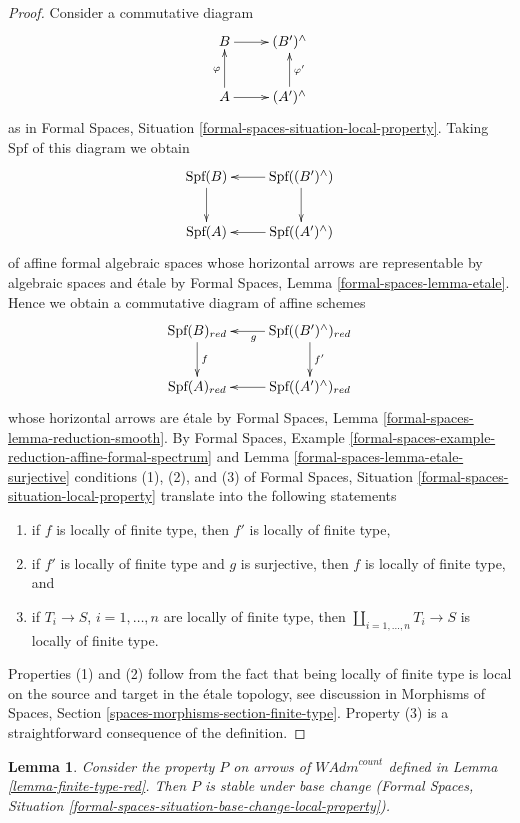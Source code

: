 \documentclass{stacks-project}
\theoremstyle{plain}
\newtheorem{lemma}[subsection]{Lemma}
\theoremstyle{definition}
\theoremstyle{remark}
\numberwithin{equation}{subsection}
\begin{document}
\begin{proof}
Consider a commutative diagram
$$
\xymatrix{
B \ar[r] & (B')^\wedge \\
A \ar[r] \ar[u]^\varphi & (A')^\wedge \ar[u]_{\varphi'}
}
$$
as in Formal Spaces, Situation
\ref{formal-spaces-situation-local-property}.
Taking $\text{Spf}$ of this diagram we obtain
$$
\xymatrix{
\text{Spf}(B) \ar[d] &
\text{Spf}((B')^\wedge) \ar[l] \ar[d] \\
\text{Spf}(A) &
\text{Spf}((A')^\wedge) \ar[l]
}
$$
of affine formal algebraic spaces whose horizontal arrows are
representable by algebraic spaces and \'etale by
Formal Spaces, Lemma \ref{formal-spaces-lemma-etale}.
Hence we obtain a commutative diagram of affine schemes
$$
\xymatrix{
\text{Spf}(B)_{red} \ar[d]^f &
\text{Spf}((B')^\wedge)_{red} \ar[l]^g \ar[d]^{f'} \\
\text{Spf}(A)_{red} &
\text{Spf}((A')^\wedge)_{red} \ar[l]
}
$$
whose horizontal arrows are \'etale by
Formal Spaces, Lemma \ref{formal-spaces-lemma-reduction-smooth}.
By Formal Spaces, Example
\ref{formal-spaces-example-reduction-affine-formal-spectrum} and
Lemma \ref{formal-spaces-lemma-etale-surjective}
conditions (1), (2), and (3) of
Formal Spaces, Situation
\ref{formal-spaces-situation-local-property}
translate into the following statements
\begin{enumerate}
\item if $f$ is locally of finite type, then $f'$ is locally of finite type,
\item if $f'$ is locally of finite type and $g$ is surjective, then
$f$ is locally of finite type, and
\item if $T_i \to S$, $i = 1, \ldots, n$ are locally of finite type, then
$\coprod_{i = 1, \ldots, n} T_i \to S$ is locally of finite type.
\end{enumerate}
Properties (1) and (2) follow from the fact that being locally
of finite type is local on the source and target in the
\'etale topology, see discussion in
Morphisms of Spaces, Section \ref{spaces-morphisms-section-finite-type}.
Property (3) is a straightforward consequence of the definition.
\end{proof}

\begin{lemma}
\label{lemma-base-change-finite-type-red}
Consider the property $P$ on arrows of $\textit{WAdm}^{count}$ defined in
Lemma \ref{lemma-finite-type-red}. Then $P$ is stable under base change
(Formal Spaces, Situation
\ref{formal-spaces-situation-base-change-local-property}).
\end{lemma}
\end{document}
